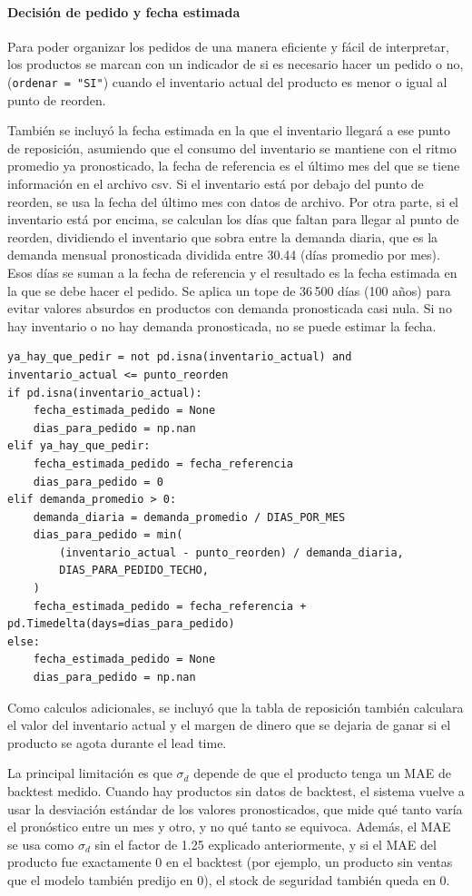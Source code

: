 \paragraph{Decisión de pedido y fecha estimada}

Para poder organizar los pedidos de una manera eficiente y fácil de interpretar, los productos se marcan con un indicador de si es necesario hacer un pedido o no, (\texttt{ordenar = "SI"}) cuando el inventario actual del producto es menor o igual al punto de reorden.

También se incluyó la fecha estimada en la que el inventario llegará a ese punto de reposición, asumiendo que el consumo del inventario se mantiene con el ritmo promedio ya pronosticado, la fecha de referencia es el último mes del que se tiene información en el archivo csv. Si el inventario está por debajo del punto de reorden, se usa la fecha del último mes con datos de archivo. Por otra parte, si el inventario está por encima, se calculan los días que faltan para llegar al punto de reorden, dividiendo el inventario que sobra entre la demanda diaria, que es la demanda mensual pronosticada dividida entre 30.44 (días promedio por mes). Esos días se suman a la fecha de referencia y el resultado es la fecha estimada en la que se debe hacer el pedido. Se aplica un tope de 36\,500 días (100 años) para evitar valores absurdos en productos con demanda pronosticada casi nula. Si no hay inventario o no hay demanda pronosticada, no se puede estimar la fecha.

\label{lst:fecha_estimada_pedido}
\begin{verbatim}
ya_hay_que_pedir = not pd.isna(inventario_actual) and inventario_actual <= punto_reorden
if pd.isna(inventario_actual):
    fecha_estimada_pedido = None
    dias_para_pedido = np.nan
elif ya_hay_que_pedir:
    fecha_estimada_pedido = fecha_referencia
    dias_para_pedido = 0
elif demanda_promedio > 0:
    demanda_diaria = demanda_promedio / DIAS_POR_MES
    dias_para_pedido = min(
        (inventario_actual - punto_reorden) / demanda_diaria,
        DIAS_PARA_PEDIDO_TECHO,
    )
    fecha_estimada_pedido = fecha_referencia + pd.Timedelta(days=dias_para_pedido)
else:
    fecha_estimada_pedido = None
    dias_para_pedido = np.nan
\end{verbatim}

Como calculos adicionales, se incluyó que la tabla de reposición también calculara el valor del inventario actual y el margen de dinero que se dejaria de ganar si el producto se agota durante el lead time.

La principal limitación es que $\sigma_d$ depende de que el producto tenga un MAE de backtest medido. Cuando hay productos sin datos de backtest, el sistema vuelve a usar la desviación estándar de los valores pronosticados, que mide qué tanto varía el pronóstico entre un mes y otro, y no qué tanto se equivoca. Además, el MAE se usa como $\sigma_d$ sin el factor de 1.25 explicado anteriormente, y si el MAE del producto fue exactamente 0 en el backtest (por ejemplo, un producto sin ventas que el modelo también predijo en 0), el stock de seguridad también queda en 0.
